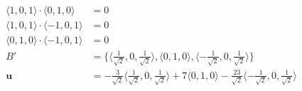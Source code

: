 \documentclass{article}
\begin{document}
\setcounter{subsubsection}{2}
\subsubsection{}

\begin{align*}
  \langle 1, 0, 1 \rangle \cdot \langle 0, 1, 0 \rangle  & = 0                                                                                                                                                                                          \\
  \langle 1, 0, 1 \rangle \cdot \langle -1, 0, 1 \rangle & = 0                                                                                                                                                                                          \\
  \langle 0, 1, 0 \rangle \cdot \langle -1, 0, 1 \rangle & = 0                                                                                                                                                                                          \\
  B'                                                     & = \{\langle \frac{1}{\sqrt{2}}, 0, \frac{1}{\sqrt{2}} \rangle, \langle 0, 1, 0 \rangle, \langle -\frac{1}{\sqrt{2}}, 0, \frac{1}{\sqrt{2}} \rangle\}                                         \\
  \mathbf{u}                                             & = -\frac{3}{\sqrt{2}} \langle \frac{1}{\sqrt{2}}, 0, \frac{1}{\sqrt{2}} \rangle + 7 \langle 0, 1, 0 \rangle - \frac{23}{\sqrt{2}} \langle -\frac{1}{\sqrt{2}}, 0, \frac{1}{\sqrt{2}} \rangle
\end{align*}

\setcounter{subsubsection}{4}
\subsubsection{}
\end{document}
